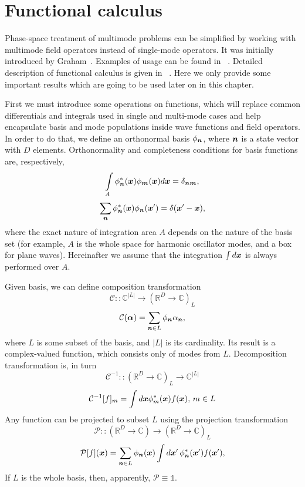 \section{Functional calculus}

Phase-space treatment of multimode problems can be simplified by working with multimode field operators instead of single-mode operators.
It was initially introduced by Graham~\cite{Graham1970,Graham1970a}.
Examples of usage can be found in ~\cite{Steel1998,Norrie2006a}.
Detailed description of functional calculus is given in~\cite{Dalton2011} .
Here we only provide some important results which are going to be used later on in this chapter.

First we must introduce some operations on functions,
which will replace common differentials and integrals used in single and multi-mode cases and help encapsulate basis and mode populations inside wave functions and field operators.
In order to do that, we define an orthonormal basis $\phi_{\boldsymbol{n}}$,
where $\boldsymbol{n}$ is a state vector with $D$ elements.
Orthonormality and completeness conditions for basis functions are, respectively,
\[
	\int\limits_A \phi_{\boldsymbol{n}}^*(\boldsymbol{x}) \phi_{\boldsymbol{m}}(\boldsymbol{x}) d\boldsymbol{x} = \delta_{\boldsymbol{n}\boldsymbol{m}},
\]
\[
	\sum_{\boldsymbol{n}} \phi_{\boldsymbol{n}}^*(\boldsymbol{x}) \phi_{\boldsymbol{n}}(\boldsymbol{x}^\prime) = \delta(\boldsymbol{x}^\prime - \boldsymbol{x}),
\]
where the exact nature of integration area $A$ depends on the nature of the basis set
(for example, $A$ is the whole space for harmonic oscillator modes, and a box for plane waves).
Hereinafter we assume that the integration $\int d\boldsymbol{x}$ is always performed over $A$.

Given basis, we can define composition transformation
\[
	\mathcal{C} :: \mathbb{C}^{|L|} \rightarrow (\mathbb{R}^D \rightarrow \mathbb{C})_L
\]
\[
	\mathcal{C}(\bm{\alpha}) = \sum_{\boldsymbol{n} \in L} \phi_{\boldsymbol{n}} \alpha_{\boldsymbol{n}},
\]
where $L$ is some subset of the basis,
and $|L|$ is its cardinality.
Its result is a complex-valued function, which consists only of modes from $L$.
Decomposition transformation is, in turn
\[
	\mathcal{C}^{-1} :: (\mathbb{R}^D \rightarrow \mathbb{C})_L \rightarrow \mathbb{C}^{|L|}
\]
\[
	\mathcal{C}^{-1}[f]_m = \int d\boldsymbol{x} \phi_m^*(\boldsymbol{x}) f(\boldsymbol{x}),\,m \in L
\]
Any function can be projected to subset $L$ using the projection transformation
\[
	\mathcal{P} ::
	(\mathbb{R}^D \rightarrow \mathbb{C}) \rightarrow (\mathbb{R}^D \rightarrow \mathbb{C})_L
\]
\begin{equation}
\label{eqn:formalism:func-calculus:projector}
	\mathcal{P}[f](\boldsymbol{x})
	= \sum_{\boldsymbol{n} \in L} \phi_{\boldsymbol{n}} (\boldsymbol{x}) \int
		d\boldsymbol{x}^\prime\, \phi_{\boldsymbol{n}}^*(\boldsymbol{x}^\prime) f(\boldsymbol{x}^\prime),
\end{equation}
If $L$ is the whole basis, then, apparently, $\mathcal{P} \equiv \mathds{1}$.

